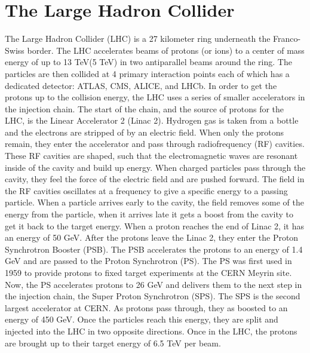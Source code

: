 \section{The Large Hadron Collider}
The Large Hadron Collider (LHC) is a 27 kilometer ring underneath the Franco-Swiss border. The LHC accelerates beams of protons (or ions) to a center of mass energy of up to 13 TeV(5 TeV) in two antiparallel beams around the ring. The particles are then collided at 4 primary interaction points each of which has a dedicated detector: ATLAS, CMS, ALICE, and LHCb.\linebreak
\indent In order to get the protons up to the collision energy, the LHC uses a series of smaller accelerators in the injection chain. The start of the chain, and the source of protons for the LHC, is the Linear Accelerator 2 (Linac 2). Hydrogen gas is taken from a bottle and the electrons are stripped of by an electric field. When only the protons remain, they enter the accelerator and pass through radiofrequency (RF) cavities. These RF cavities are shaped, such that the electromagnetic waves are resonant inside of the cavity and build up energy. When charged particles pass through the cavity, they feel the force of the electric field and are pushed forward. The field in the RF cavities oscillates at a frequency to give a specific energy to a passing particle. When a particle arrives early to the cavity, the field removes some of the energy from the particle, when it arrives late it gets a boost from the cavity to get it back to the target energy. When a proton reaches the end of Linac 2, it has an energy of 50 GeV.\linebreak
\indent After the protons leave the Linac 2, they enter the Proton Synchrotron Booster (PSB). The PSB accelerates the protons to an energy of 1.4 GeV and are passed to the Proton Synchrotron (PS). The PS was first used in 1959 to provide protons to fixed target experiments at the CERN Meyrin site. Now, the PS accelerates protons to 26 GeV and delivers them to the next step in the injection chain, the Super Proton Synchrotron (SPS). The SPS is the second largest accelerator at CERN. As protons pass through, they as boosted to an energy of 450 GeV. Once the particles reach this energy, they are split and injected into the LHC in two opposite directions. Once in the LHC, the protons are brought up to their target energy of 6.5 TeV per beam.
